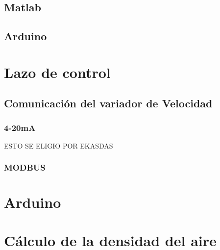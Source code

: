 \documentclass[12pt,a4paper]{article}
\begin{document}
	\subsection{Matlab}
	\subsection{Arduino}
	\section{Lazo de control}
	\subsection{Comunicación del variador de Velocidad}
	\subsubsection{4-20mA}
	ESTO SE ELIGIO POR EKASDAS
	\subsubsection{MODBUS}
	\section{Arduino}

	\section{Cálculo de la densidad del aire}

\newpage

\end{document}
